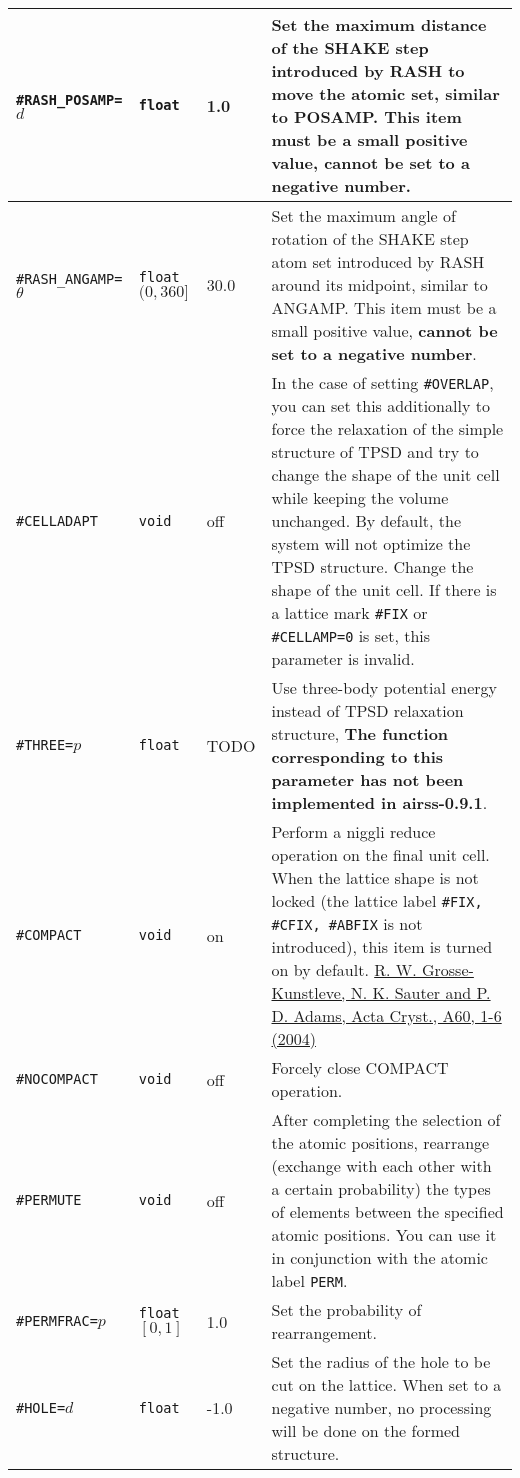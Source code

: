 \documentclass[a4paper, 10pt]{article}
\begin{document}
\begin{center}
\begin{longtable}{m{11em}|m{4em}<{\centering}|m{3em}<{\centering}|m{15em}}
\midrule
\verb|#RASH_POSAMP=|\(d\)& \verb|float| & 1.0 & Set the maximum distance of the SHAKE step introduced by RASH to move the atomic set, similar to POSAMP. This item must be a small positive value, \textbf{cannot be set to a negative number}.\\
\midrule
\verb|#RASH_ANGAMP=|\(\theta\) & \verb|float| \((0,360]\) & 30.0 & Set the maximum angle of rotation of the SHAKE step atom set introduced by RASH around its midpoint, similar to ANGAMP. This item must be a small positive value, \textbf{cannot be set to a negative number}.\\
\midrule
\verb|#CELLADAPT|& \verb|void| & off & In the case of setting \verb|#OVERLAP|, you can set this additionally to force the relaxation of the simple structure of TPSD and try to change the shape of the unit cell while keeping the volume unchanged. By default, the system will not optimize the TPSD structure. Change the shape of the unit cell. If there is a lattice mark \verb|#FIX| or \verb|#CELLAMP=0| is set, this parameter is invalid. \\
\midrule
\verb|#THREE=|\(p\)& \verb|float| & TODO & Use three-body potential energy instead of TPSD relaxation structure, \textbf{The function corresponding to this parameter has not been implemented in airss-0.9.1}.\\
\midrule
\verb|#COMPACT|& \verb|void| & on & Perform a niggli reduce operation on the final unit cell. When the lattice shape is not locked (the lattice label \verb|#FIX, #CFIX, #ABFIX| is not introduced), this item is turned on by default. \href{http://atztogo.github.io/niggli/#algorithm}{R. W. Grosse-Kunstleve, N. K. Sauter and P. D. Adams, Acta Cryst., A60, 1-6 (2004)} \\
\midrule
\verb|#NOCOMPACT| & \verb|void| & off & Forcely close COMPACT operation.\\
\midrule
\verb|#PERMUTE| & \verb|void| & off & After completing the selection of the atomic positions, rearrange (exchange with each other with a certain probability) the types of elements between the specified atomic positions. You can use it in conjunction with the atomic label \verb|PERM|.\\
\midrule
\verb|#PERMFRAC=|\(p\) & \verb|float| \([0,1]\)  & 1.0 & Set the probability of rearrangement.\\
\midrule
\verb|#HOLE=|\(d\) & \verb|float| & -1.0 & Set the radius of the hole to be cut on the lattice. When set to a negative number, no processing will be done on the formed structure.\\

\end{longtable}
\end{center}
\end{document}
